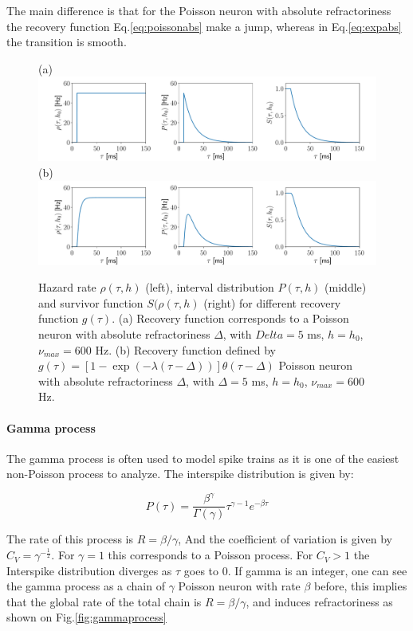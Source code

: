 \documentclass[12pt,twoside]{report}
\begin{document}
The main difference is that for the Poisson neuron with absolute refractoriness the recovery function Eq.\eqref{eq:poissonabs} make a jump, whereas in Eq.\eqref{eq:expabs} the transition is smooth.

\begin{figure}[h!]
	(a) \\
	\includegraphics[width=\linewidth]{poissonRHOSP.pdf}
	(b)\\
	\includegraphics[width=\linewidth]{expRHOSP.pdf}
	\caption{Hazard rate $\rho(\tau,h)$ (left), interval distribution $P(\tau,h)$ (middle) and survivor function $S(\rho(\tau,h)$ (right) for different recovery function $g(\tau)$. (a) Recovery function corresponds to a Poisson neuron with absolute refractoriness $\Delta$, with $Delta=5$ ms, $h=h_0$, $\nu_{max}=600$ Hz.  (b) Recovery function defined  by $ g(\tau)=\left[1-\exp(-\lambda(\tau-\Delta))\right]\theta(\tau-\Delta)$ Poisson neuron with absolute refractoriness $\Delta$, with $\Delta=5$ ms, $h=h_0$, $\nu_{max}=600$ Hz.  }
	\label{fig:renewalprocess}
\end{figure}


\paragraph{Gamma process}

The gamma process is often used to model spike trains as it is one of the easiest non-Poisson process to analyze. The interspike distribution is given by:

\begin{equation}
\label{eq:gamma}
P(\tau)=\frac{\beta^\gamma}{\Gamma(\gamma)}\tau^{\gamma-1}e^{-\beta\tau}
\end{equation}

The rate of this process  is $R=\beta/\gamma$, And the coefficient of variation is given by $C_V=\gamma^{-\frac{1}{2}}$. For $\gamma=1$ this corresponds to a Poisson process. For $C_V>1$ the Interspike distribution diverges as $\tau$ goes to $0$. If gamma is an integer, one can see the gamma process as a chain of $\gamma$ Poisson neuron with rate $\beta$ before, this implies that the global rate of the total chain is $R=\beta/\gamma$, and induces refractoriness as shown on Fig.\ref{fig:gammaprocess}
\end{document}
